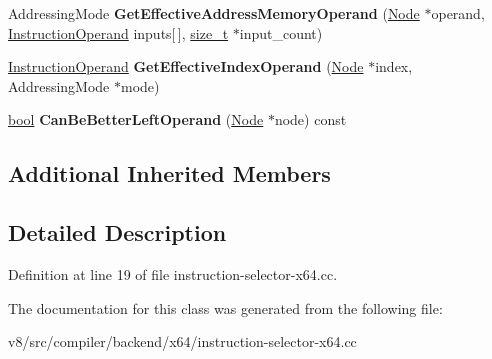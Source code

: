 \begin{DoxyCompactItemize}
\item 
\mbox{\label{classv8_1_1internal_1_1compiler_1_1X64OperandGenerator_aa794b876b7305b077a2ad11adbc153e3}} 
Addressing\+Mode {\bfseries Get\+Effective\+Address\+Memory\+Operand} (\mbox{\hyperlink{classv8_1_1internal_1_1compiler_1_1Node}{Node}} $\ast$operand, \mbox{\hyperlink{classv8_1_1internal_1_1compiler_1_1InstructionOperand}{Instruction\+Operand}} inputs\mbox{[}$\,$\mbox{]}, \mbox{\hyperlink{classsize__t}{size\+\_\+t}} $\ast$input\+\_\+count)
\item 
\mbox{\label{classv8_1_1internal_1_1compiler_1_1X64OperandGenerator_a6331c00cdef46f4371b6aee778890dc2}} 
\mbox{\hyperlink{classv8_1_1internal_1_1compiler_1_1InstructionOperand}{Instruction\+Operand}} {\bfseries Get\+Effective\+Index\+Operand} (\mbox{\hyperlink{classv8_1_1internal_1_1compiler_1_1Node}{Node}} $\ast$index, Addressing\+Mode $\ast$mode)
\item 
\mbox{\label{classv8_1_1internal_1_1compiler_1_1X64OperandGenerator_a58a76db293772c7ecb5a698c2ba39988}} 
\mbox{\hyperlink{classbool}{bool}} {\bfseries Can\+Be\+Better\+Left\+Operand} (\mbox{\hyperlink{classv8_1_1internal_1_1compiler_1_1Node}{Node}} $\ast$node) const
\end{DoxyCompactItemize}
\subsection*{Additional Inherited Members}


\subsection{Detailed Description}


Definition at line 19 of file instruction-\/selector-\/x64.\+cc.



The documentation for this class was generated from the following file\+:\begin{DoxyCompactItemize}
\item 
v8/src/compiler/backend/x64/instruction-\/selector-\/x64.\+cc\end{DoxyCompactItemize}
